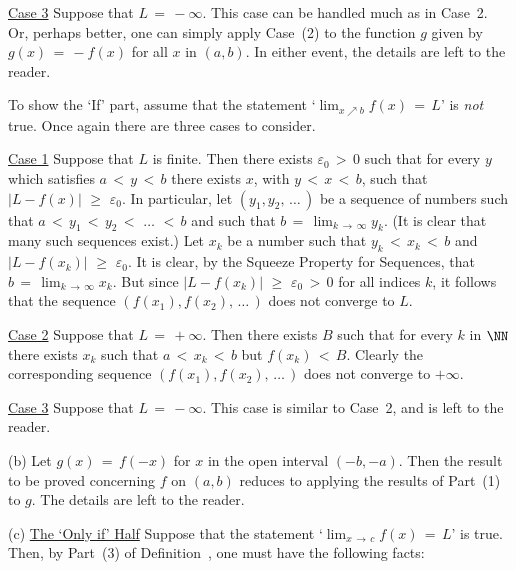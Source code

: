 {        \underline{Case 3} Suppose that $L \,=\, -{\infty}$.
    This case can be handled much as in Case~2.
    Or, perhaps better, one can simply apply Case~(2) to the function $g$ given by $g(x) \,=\, -f(x)$ for all $x$ in $(a,b)$.
    In either event, the details are left to the reader.

        To show the `If' part, assume that the statement `${\displaystyle \lim_{x{\nearrow}b} f(x) \,=\, L}$' is {\em not} true.
    Once again there are three cases to consider.

        \underline{Case 1} Suppose that $L$ is finite.
    Then there exists ${\varepsilon}_{0}\,>\,0$ such that for every $y$ which satisfies $a\,<\,y\,<\,b$ there exists $x$, with $y\,<\,x\,<\,b$, such that $|L-f(x)|\,\,{\geq}\,\,{\varepsilon}_{0}$.
    In particular, let $(y_{1},y_{2},\,{\ldots}\,)$ be a sequence of numbers such that $a\,<\,y_{1}\,<\,y_{2}\,<\,\,{\ldots}\,\,<\,b$ and such that $b \,=\, \lim_{k \,{\rightarrow}\, {\infty}} y_{k}$.
    (It is clear that many such sequences exist.) Let $x_{k}$ be a number such that $y_{k}\,<\,x_{k}\,<\,b$ and $|L-f(x_{k})|\,\,{\geq}\,\,{\varepsilon}_{0}$.
    It is clear, by the Squeeze Property for Sequences, that $b \,=\, \lim_{k \,{\rightarrow}\, {\infty}} x_{k}$.
    But since $|L-f(x_{k})|\,\,{\geq}\,\,{\varepsilon}_{0}\,>\,0$ for all indices $k$, it follows that the sequence $(f(x_{1}),f(x_{2}),\,{\ldots}\,)$ does not converge to $L$.

        \underline{Case 2} Suppose that $L \,=\, +{\infty}$. Then there exists $B$ such that for every $k$ in ${\NN}$ there exists $x_{k}$ such that $a\,<\,x_{k}\,<\,b$ but $f(x_{k})\,<\,B$.
    Clearly the corresponding sequence $(f(x_{1}),f(x_{2}),\,{\ldots}\,)$ does not converge to $+{\infty}$.

        \underline{Case 3} Suppose that $L \,=\, -{\infty}$. This case is similar to Case~2, and is left to the reader.

\V

        (b) Let $g(x) \,=\, f(-x)$ for $x$ in the open interval $(-b,-a)$.
    Then the result to be proved concerning $f$ on $(a,b)$ reduces to applying the results of Part~(1) to $g$.
    The details are left to the reader.

\V

        (c) \underline{The `Only if' Half} Suppose that the statement `${\displaystyle \lim_{x \,{\rightarrow}\, c} f(x) \,=\, L}$' is true.
    Then, by Part~(3) of Definition~, one must have the following facts:

}
